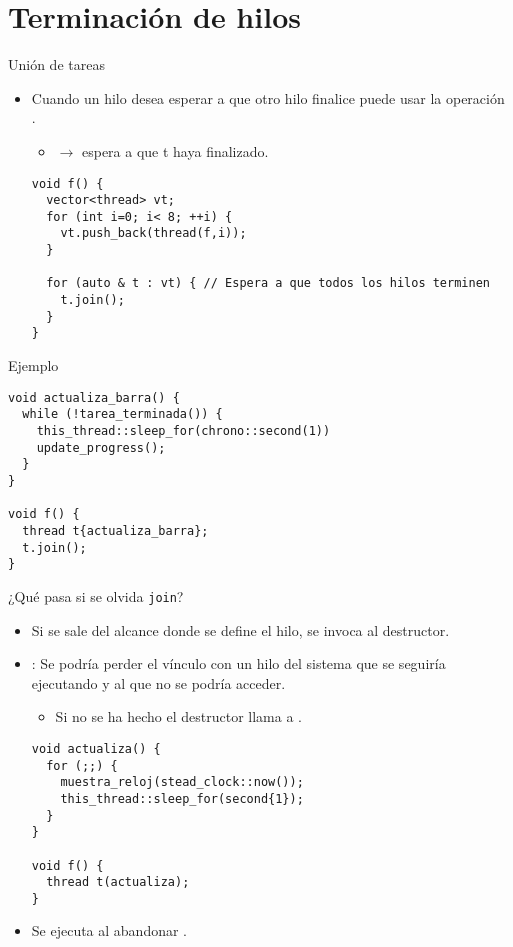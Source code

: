 \section{Terminación de hilos}

\begin{frame}[t,fragile]{Unión de tareas}
\begin{itemize}
  \item Cuando un hilo desea esperar a que otro hilo finalice puede usar la operación .
    \begin{itemize}
      \item {} $\rightarrow$ espera a que t haya finalizado.
    \end{itemize}
\begin{lstlisting}
void f() {
  vector<thread> vt;
  for (int i=0; i< 8; ++i) {
    vt.push_back(thread(f,i));
  }

  for (auto & t : vt) { // Espera a que todos los hilos terminen
    t.join();
  }
}
\end{lstlisting}
\end{itemize}
\end{frame}

\begin{frame}[t,fragile]{Ejemplo}
\begin{lstlisting}
void actualiza_barra() {
  while (!tarea_terminada()) {
    this_thread::sleep_for(chrono::second(1))
    update_progress();
  }
}

void f() {
  thread t{actualiza_barra};
  t.join();
}
\end{lstlisting}
\end{frame}

\begin{frame}[t,fragile]{¿Qué pasa si se olvida \texttt{join}?}
\begin{itemize}
  \item Si se sale del alcance donde se define el hilo, se invoca al destructor.
  \item {}: Se podría perder el vínculo con un hilo del sistema que se seguiría
        ejecutando y al que no se podría acceder.
    \begin{itemize}
      \item Si no se ha hecho  el destructor llama a .
    \end{itemize}
\begin{lstlisting}
void actualiza() {
  for (;;) {
    muestra_reloj(stead_clock::now());
    this_thread::sleep_for(second{1});
  }
}

void f() {
  thread t(actualiza);
}
\end{lstlisting}
  \item Se ejecuta  al abandonar .
\end{itemize}
\end{frame}

